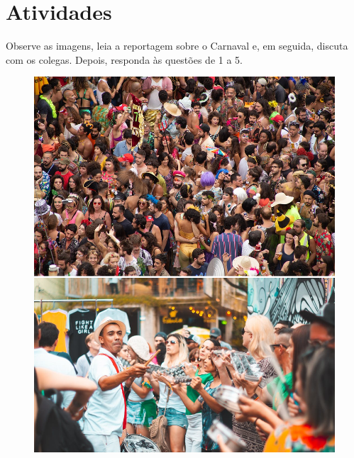 \pagebreak
\section{Atividades}

Observe as imagens, leia a reportagem sobre o Carnaval e, em seguida,
discuta com os colegas. Depois, responda às questões de 1 a 5.

\begin{figure}[htpb!]
\includegraphics[width=\textwidth]{./imgs/img39b.png}
\end{figure}


\pagebreak

